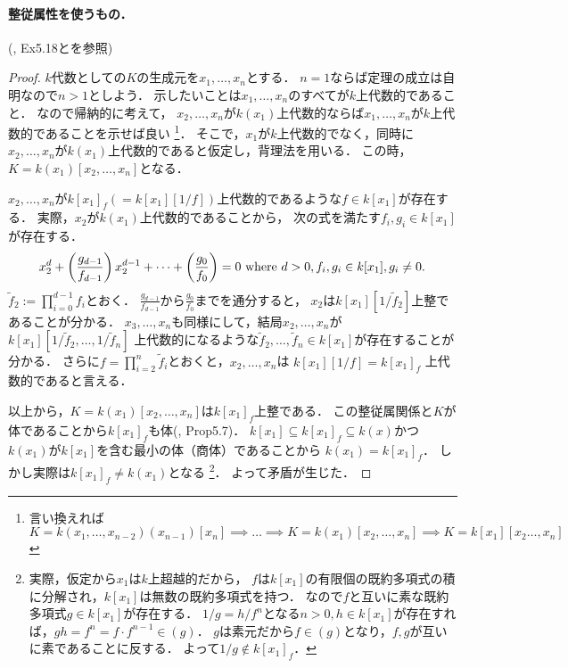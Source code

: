 \paragraph{整従属性を使うもの．}
(\cite{atimac}, Ex5.18と\cite{oneline}を参照)
\begin{proof}
    $k$代数としての$K$の生成元を$x_1,\dots,x_n$とする．
    $n=1$ならば定理の成立は自明なので$n>1$としよう．
    示したいことは$x_1,\dots,x_n$のすべてが$k$上代数的であること．
    なので帰納的に考えて，
    $x_2,\dots,x_n$が$k(x_1)$上代数的ならば$x_1,\dots,x_n$が$k$上代数的であることを示せば良い
    \footnote
    {
        言い換えれば
        $K=k(x_1,\dots,x_{n-2})(x_{n-1})[x_n] 
        \implies \dots \implies K=k(x_1)[x_2,\dots,x_n] \implies K=k[x_1][x_2\dots,x_n]$
    }．
    そこで，$x_1$が$k$上代数的でなく，同時に
    $x_2,\dots,x_n$が$k(x_1)$上代数的であると仮定し，背理法を用いる．
    この時，$K=k(x_1)[x_2,\dots,x_n]$となる．

    $x_2,\dots,x_n$が$k[x_1]_f(=k[x_1][1/f])$上代数的であるような$f \in k[x_1]$が存在する．
    実際，$x_2$が$k(x_1)$上代数的であることから，
    次の式を満たす$f_{i},g_{i} \in k[x_1]$が存在する．
    \[
        x_2^{d}+\left( \frac{g_{d-1}}{f_{d-1}} \right) x_2^{d-1}+\dots+\left(\frac{g_{0}}{f_{0}}\right)=0
        \text{ where } d>0, f_{i},g_{i} \in k[x_1], g_{i} \neq 0.
    \]
    $\tilde{f}_2:=\prod_{i=0}^{d-1} f_{i}$とおく．
    $\frac{g_{d-1}}{f_{d-1}}$から$\frac{g_{0}}{f_{0}}$までを通分すると，
    $x_2$は$k[x_1][1/\tilde{f}_2]$上整であることが分かる．
    $x_3,\dots,x_n$も同様にして，結局$x_2,\dots,x_n$が
    $k[x_1]\left[1/\tilde{f}_2,\dots,1/\tilde{f}_n\right]$
    上代数的になるような$\tilde{f}_2,\dots,\tilde{f}_n \in k[x_1]$が存在することが分かる．
    さらに$f=\prod_{i=2}^n \tilde{f}_i$とおくと，$x_2,\dots,x_n$は
    $k[x_1]\left[1/f\right]=k[x_1]_f$
    上代数的であると言える．

    以上から，$K=k(x_1)[x_2,\dots,x_n]$は$k[x_1]_f$上整である．
    この整従属関係と$K$が体であることから$k[x_1]_f$も体(\cite{atimac}, Prop5.7)．
    $k[x_1] \subseteq k[x_1]_f \subseteq k(x)$かつ$k(x_1)$が$k[x_1]$を含む最小の体（商体）であることから
    $k(x_1)=k[x_1]_f$．
    しかし実際は$k[x_1]_f \neq k(x_1)$となる
    \footnote
    {
    実際，仮定から$x_1$は$k$上超越的だから，
    $f$は$k[x_1]$の有限個の既約多項式の積に分解され，$k[x_1]$は無数の既約多項式を持つ．
    なので$f$と互いに素な既約多項式$g \in k[x_1]$が存在する．
    $1/g=h/f^n$となる$n>0, h \in k[x_1]$が存在すれば，$gh=f^n=f \cdot f^{n-1} \in (g)$．
    $g$は素元だから$f \in (g)$となり，$f,g$が互いに素であることに反する．
    よって$1/g \not \in k[x_1]_f$．
    }．
    よって矛盾が生じた．
\end{proof}

